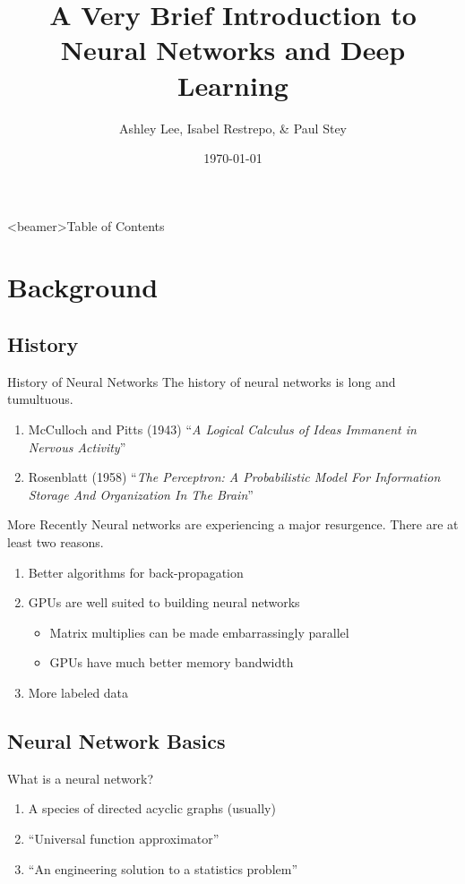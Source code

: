 \documentclass[pdf]{beamer}
\title[Intro to Deep Learning]{A Very Brief Introduction to Neural Networks and Deep Learning}
\author{Ashley Lee, Isabel Restrepo, \& Paul Stey}
\date{\today}
\begin{document}
\begin{frame}
\titlepage
\end{frame}



\begin{frame}<beamer>{Table of Contents}
	\tableofcontents[currentsection, 
				 currentsubsection, 
				 sectionstyle=show, 
				 subsectionstyle=show]
\end{frame}

\section{Background}


\subsection{History}
	\begin{frame}{History of Neural Networks}
	The history of neural networks is long and tumultuous.
	
		\begin{enumerate}
			\item McCulloch and Pitts (1943) ``\textit{A Logical Calculus of Ideas Immanent in Nervous Activity}''
			\item Rosenblatt (1958) ``\textit{The Perceptron: A Probabilistic Model For Information Storage And Organization In The Brain}''
		\end{enumerate}		
	\end{frame}
	
	\begin{frame}{More Recently}
	Neural networks are experiencing a major resurgence. There are at least two reasons.
	
		\begin{enumerate}
			\item Better algorithms for back-propagation
			\item GPUs are well suited to building neural networks
				\begin{itemize}
					\item Matrix multiplies can be made embarrassingly parallel 
					\item GPUs have much better memory bandwidth
				\end{itemize}
			\item More labeled data
		\end{enumerate}
	\end{frame}


\subsection{Neural Network Basics}
	\begin{frame}{What is a neural network?}
		\begin{enumerate}
			\item A species of directed acyclic graphs (usually)
			\item ``Universal function approximator''
			\item ``An engineering solution to a statistics problem''
		\end{enumerate}
	\end{frame}
	
\end{document}
